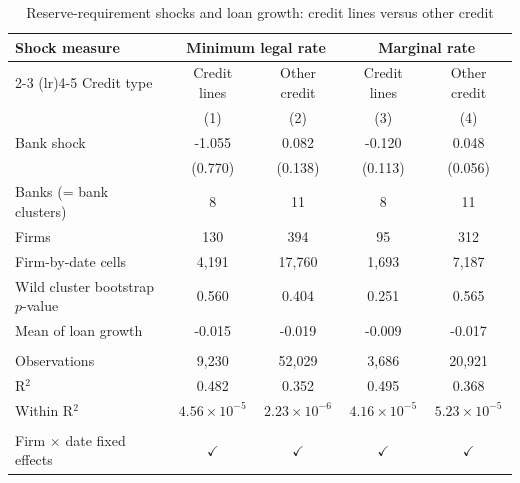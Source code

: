 \documentclass[11pt]{article}
\renewcommand{\_}{\origunderscore\hspace{0pt}}  %
\begin{document}
\begin{table}[!h]
   \centering
   \small
   \begin{threeparttable}[b]
      \caption{\label{tab:encaje_loan_growth} Reserve-requirement shocks and loan growth: credit lines versus other credit}
      \bigskip
      \begin{tabular}{lcccc}
         \toprule
         Shock measure & \multicolumn{2}{c}{Minimum legal rate} & \multicolumn{2}{c}{Marginal rate} \\ 
         \cmidrule(lr){2-3} \cmidrule(lr){4-5}
         Credit type                       & Credit lines          & Other credit          & Credit lines          & Other credit \\   
                                           & (1)                   & (2)                   & (3)                   & (4)\\  
         \midrule 
         Bank shock                        & -1.055                & 0.082                 & -0.120                & 0.048\\   
                                           & (0.770)               & (0.138)               & (0.113)               & (0.056)\\   
         Banks (= bank clusters)           & 8                     & 11                    & 8                     & 11\\  
         Firms                             & 130                   & 394                   & 95                    & 312\\  
         Firm-by-date cells                & 4,191                 & 17,760                & 1,693                 & 7,187\\  
         Wild cluster bootstrap $p$-value  & 0.560                 & 0.404                 & 0.251                 & 0.565\\  
         Mean of loan growth               & -0.015                & -0.019                & -0.009                & -0.017\\  
          \\
         Observations                      & 9,230                 & 52,029                & 3,686                 & 20,921\\  
         R$^2$                             & 0.482                 & 0.352                 & 0.495                 & 0.368\\  
         Within R$^2$                      & $4.56\times 10^{-5}$  & $2.23\times 10^{-6}$  & $4.16\times 10^{-5}$  & $5.23\times 10^{-5}$\\   
          \\
         Firm $\times$ date fixed effects  & $\checkmark$          & $\checkmark$          & $\checkmark$          & $\checkmark$\\   
         \bottomrule
      \end{tabular}
      

\end{threeparttable}
\end{table}
\end{document}
